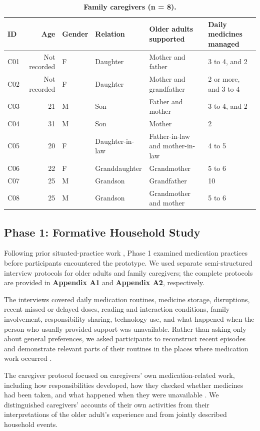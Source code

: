 \begin{table}[t]
  \caption{\textbf{Family caregivers (n = 8).}}
  \label{tab:caregivers}
  \small
  \begin{tabular}{lrllll}
    \toprule
    ID & Age & Gender & Relation & Older adults supported & Daily medicines managed \\
    \midrule
    C01 & Not recorded & F & Daughter & Mother and father & 3 to 4, and 2 \\
    C02 & Not recorded & F & Daughter & Mother and grandfather & 2 or more, and 3 to 4 \\
    C03 & 21 & M & Son & Father and mother & 3 to 4, and 2 \\
    C04 & 31 & M & Son & Mother & 2 \\
    C05 & 20 & F & Daughter-in-law & Father-in-law and mother-in-law & 4 to 5 \\
    C06 & 22 & F & Granddaughter & Grandmother & 5 to 6 \\
    C07 & 25 & M & Grandson & Grandfather & 10 \\
    C08 & 25 & M & Grandson & Grandmother and mother & 5 to 6 \\
    \bottomrule
  \end{tabular}
\end{table}

\subsection{Phase 1: Formative Household Study}

Following prior situated-practice work \cite{61,9}, Phase 1 examined medication practices before participants encountered the prototype. We used separate semi-structured interview protocols for older adults and family caregivers; the complete protocols are provided in \textbf{Appendix A1} and \textbf{Appendix A2}, respectively.

The interviews covered daily medication routines, medicine storage, disruptions, recent missed or delayed doses, reading and interaction conditions, family involvement, responsibility sharing, technology use, and what happened when the person who usually provided support was unavailable. Rather than asking only about general preferences, we asked participants to reconstruct recent episodes and demonstrate relevant parts of their routines in the places where medication work occurred \cite{61,9}.

The caregiver protocol focused on caregivers' own medication-related work, including how responsibilities developed, how they checked whether medicines had been taken, and what happened when they were unavailable \cite{106}. We distinguished caregivers' accounts of their own activities from their interpretations of the older adult's experience and from jointly described household events.

